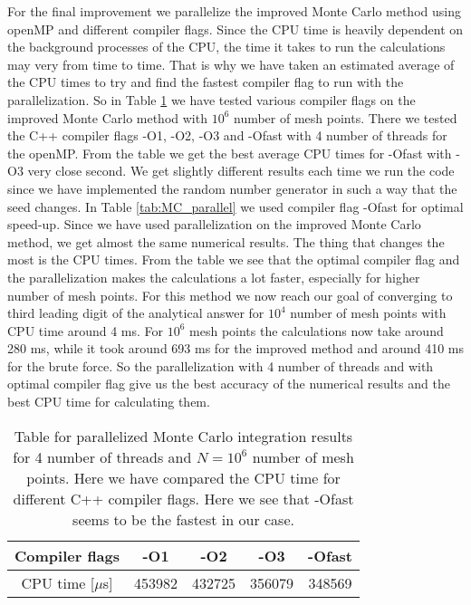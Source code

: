 \documentclass[12pt,a4paper,english]{article}
\begin{document}
For the final improvement we parallelize the improved Monte Carlo method using openMP and different compiler flags. Since the CPU time is heavily dependent on the background processes of the CPU, the time it takes to run the calculations may very from time to time. That is why we have taken an estimated average of the CPU times to try and find the fastest compiler flag to run with the parallelization. So in Table \ref{tab:MC_opt_compile} we have tested various compiler flags on the improved Monte Carlo method with $10^6$ number of mesh points. There we tested the C++ compiler flags -O1, -O2, -O3 and -Ofast with 4 number of threads for the openMP. From the table we get the best average CPU times for -Ofast with -O3 very close second. We get slightly different results each time we run the code since we have implemented the random number generator in such a way that the seed changes. In Table \ref{tab:MC_parallel} we used compiler flag -Ofast for optimal speed-up. Since we have used parallelization on the improved Monte Carlo method, we get almost the same numerical results. The thing that changes the most is the CPU times. From the table we see that the optimal compiler flag and the parallelization makes the calculations a lot faster, especially for higher number of mesh points. For this method we now reach our goal of converging to third leading digit of the analytical answer for $10^4$ number of mesh points with CPU time around 4 ms. For $10^6$ mesh points the calculations now take around 280 ms, while it took around 693 ms for the improved method and around 410 ms for the brute force. So the parallelization with 4 number of threads and with optimal compiler flag give us the best accuracy of the numerical results and the best CPU time for calculating them.

\begin{table}[htbp]
	\centering
	\begin{tabular}{ |c|c|c|c|c| }
		\hline \rule{0pt}{13pt}
		Compiler flags & -O1 & -O2 & -O3 & -Ofast \\
		\hline \rule{0pt}{13pt}
		CPU time [$\mu$s] & 453982 & 432725 & 356079 & 348569 \\
		\hline 
	\end{tabular}	
	\caption{Table for parallelized Monte Carlo integration results for 4 number of threads and $N=10^6$ number of mesh points. Here we have compared the CPU time for different C++ compiler flags. Here we see that -Ofast seems to be the fastest in our case.}
	\label{tab:MC_opt_compile}
\end{table}
\end{document}
